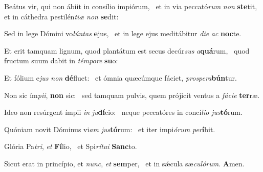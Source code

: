 \item Beátus vir, qui non ábiit in consílio impiórum,~\pscross{} et in via peccató\textit{rum} \textit{non} \textbf{ste}tit,~\psstar{} et in cáthedra pestilén\textit{tiæ} \textit{non} \textbf{se}dit:
\item Sed in lege Dómini vo\textit{lúntas} \textbf{e}jus,~\psstar{} et in lege ejus meditábitur \textit{die} \textit{ac} \textbf{noc}te.
\item Et erit tamquam lignum, quod plantátum est secus decúr\textit{sus} \textit{a}\textbf{quá}rum,~\psstar{} quod fructum suum dabit in \textit{témpore} \textbf{su}o:
\item Et fólium e\textit{jus} \textit{non} \textbf{dé}fluet:~\psstar{} et ómnia quæcúmque fáciet, \textit{prospera}\textbf{bún}tur.
\item Non sic ím\textit{pii}, \textbf{non} sic:~\psstar{} sed tamquam pulvis, quem prójicit ventus a \textit{fácie} \textbf{ter}ræ.
\item Ideo non resúrgent ímpii \textit{in} \textit{ju}\textbf{dí}cio:~\psstar{} neque peccatóres in concí\textit{lio} \textit{jus}\textbf{tó}rum.
\item Quóniam novit Dóminus vi\textit{am} \textit{jus}\textbf{tó}rum:~\psstar{} et iter impi\textit{órum} \textit{per}\textbf{í}bit.
\item Glória Pa\textit{tri}, \textit{et} \textbf{Fí}lio,~\psstar{} et Spi\textit{rítui} \textbf{Sanc}to.
\item Sicut erat in princípio, et \textit{nunc}, \textit{et} \textbf{sem}per,~\psstar{} et in sǽcula sæ\textit{culórum}. \textbf{A}men.
